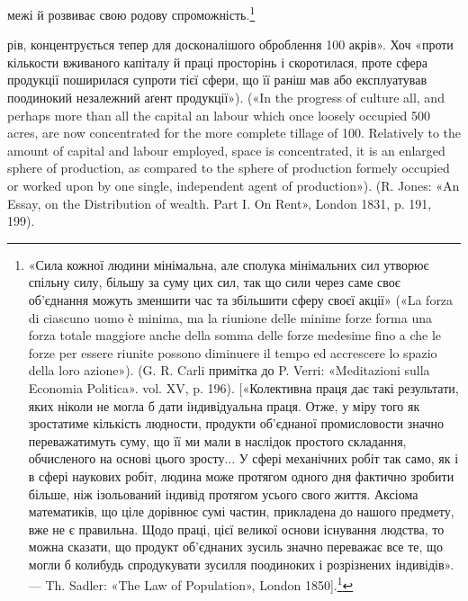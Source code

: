 межі й розвиває свою родову спроможність.\footnote{
«Сила кожної людини мінімальна, але сполука мінімальних сил
утворює спільну силу, більшу за суму цих сил, так що сили через саме
своє об’єднання можуть зменшити час та збільшити сферу своєї акції»
(«La forza di ciascuno uomo è minima, ma la riunione delle minime forze
forma una forza totale maggiore anche della somma delle forze medesime
fino a che le forze per essere riunite possono diminuere il tempo ed accrescere
lo spazio della loro azione»). (G. R. Carli примітка до P. Verri: «Meditazioni
sulla Economia Politica». vol. XV, p. 196). [«Колективна
праця дає такі результати, яких ніколи не могла б дати індивідуальна
праця. Отже, у міру того як зростатиме кількість людности, продукти
об’єднаної промисловости значно переважатимуть суму, що її ми мали
в наслідок простого складання, обчисленого на основі цього зросту...
У сфері механічних робіт так само, як і в сфері наукових робіт, людина
може протягом одного дня фактично зробити більше, ніж ізольований
індивід протягом усього свого життя. Аксіома математиків, що ціле
дорівнює сумі частин, прикладена до нашого предмету, вже не є правильна.
Щодо праці, цієї великої основи існування людства, то можна
сказати, що продукт об’єднаних зусиль значно переважає все те, що
могли б колибудь спродукувати зусилля поодиноких і розрізнених індивідів».
— Th. Sadler: «The Law of Population», London 1850].\footnote*{
Наведене тут у прямих дужках ми беремо з французького видання.
(«Le Capital etc.», v. I, ch. XIII, p. 143). \emph{Ред.}
}
}

рів, концентрується тепер для досконалішого оброблення 100 акрів».
Хоч «проти кількости вживаного капіталу й праці просторінь і скоротилася,
проте сфера продукції поширилася супроти тієї сфери, що її
раніш мав або експлуатував поодинокий незалежний аґент продукції»).
(«In the progress of culture all, and perhaps more than all the capital an
labour which once loosely occupied 500 acres, are now concentrated for the
more complete tillage of 100. Relatively to the amount of capital and labour
employed, space is concentrated, it is an enlarged sphere of production,
as compared to the sphere of production formely occupied or worked upon
by one single, independent agent of production»). (R. Jones: «An Essay,
on the Distribution of wealth. Part I. On Rent», London 1831, p. 191,
199).
\parbreak{}  %
